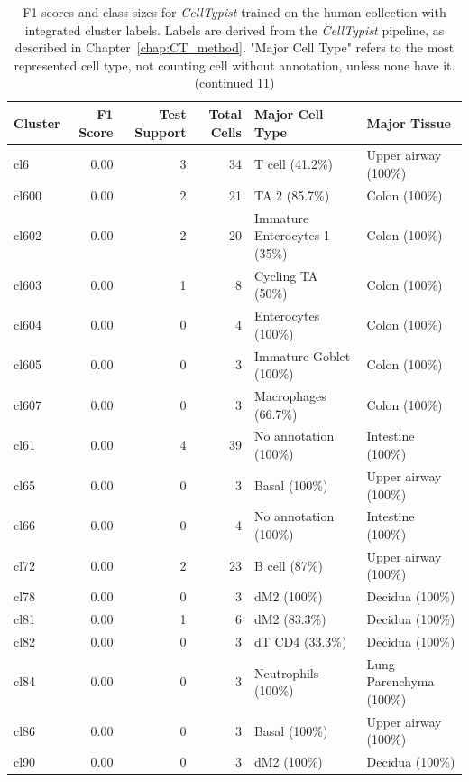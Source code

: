 \begin{table}[ht!]
\scriptsize
\caption[F1 scores and class sizes for \textit{CellTypist} trained on the human collection with integrated cluster labels (continued 11)]{F1 scores and class sizes for \textit{CellTypist} trained on the human collection with integrated cluster labels. Labels are derived from the \textit{CellTypist} pipeline, as described in Chapter~\ref{chap:CT_method}. "Major Cell Type" refers to the most represented cell type, not counting cell without annotation, unless none have it. (continued 11)}
\centering
\label{table:tab_HAmodelclust11}
\begin{tabular}{lrrrll}
  \toprule
Cluster & F1 Score & Test Support & Total Cells & Major Cell Type & Major Tissue \\ 
  \midrule  
  cl6 & 0.00 &   3 &  34 & T cell (41.2\%) & Upper airway (100\%) \\ 
  cl600 & 0.00 &   2 &  21 & TA 2 (85.7\%) & Colon (100\%) \\ 
  cl602 & 0.00 &   2 &  20 & Immature Enterocytes 1 (35\%) & Colon (100\%) \\ 
  cl603 & 0.00 &   1 &   8 & Cycling TA (50\%) & Colon (100\%) \\ 
  cl604 & 0.00 &   0 &   4 & Enterocytes (100\%) & Colon (100\%) \\ 
  cl605 & 0.00 &   0 &   3 & Immature Goblet (100\%) & Colon (100\%) \\ 
  cl607 & 0.00 &   0 &   3 & Macrophages (66.7\%) & Colon (100\%) \\ 
  cl61 & 0.00 &   4 &  39 & No annotation (100\%) & Intestine (100\%) \\ 
  cl65 & 0.00 &   0 &   3 & Basal (100\%) & Upper airway (100\%) \\ 
  cl66 & 0.00 &   0 &   4 & No annotation (100\%) & Intestine (100\%) \\ 
  cl72 & 0.00 &   2 &  23 & B cell (87\%) & Upper airway (100\%) \\ 
  cl78 & 0.00 &   0 &   3 & dM2 (100\%) & Decidua (100\%) \\ 
  cl81 & 0.00 &   1 &   6 & dM2 (83.3\%) & Decidua (100\%) \\ 
  cl82 & 0.00 &   0 &   3 & dT CD4 (33.3\%) & Decidua (100\%) \\ 
  cl84 & 0.00 &   0 &   3 & Neutrophils (100\%) & Lung Parenchyma (100\%) \\ 
  cl86 & 0.00 &   0 &   3 & Basal (100\%) & Upper airway (100\%) \\ 
  cl90 & 0.00 &   0 &   3 & dM2 (100\%) & Decidua (100\%) \\ 

\end{tabular}
\end{table}
